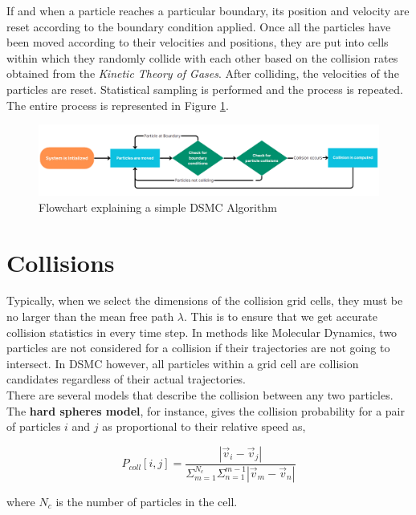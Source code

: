 \no If and when a particle reaches a particular boundary, its position and velocity are reset according to the boundary condition applied. Once all the particles have been moved according to their velocities and positions, they are put into cells within which they randomly collide with each other based on the collision rates obtained from the \textit{Kinetic Theory of Gases}. After colliding, the velocities of the particles are reset. Statistical sampling is performed and the process is repeated. The entire process is represented in Figure \ref{img:algo}.

\begin{figure}[H]
  \includegraphics[scale=0.38]{Pictures/Chapter_3_DSMC/Algorithm.png}
  \centering
  \caption{Flowchart explaining a simple DSMC Algorithm}
  \label{img:algo}
\end{figure}

\section{Collisions}

Typically, when we select the dimensions of the collision grid cells, they must be no larger than the mean free path $\lambda$. This is to ensure that we get accurate collision statistics in every time step. In methods like Molecular Dynamics, two particles are not considered for a collision if their trajectories are not going to intersect. In DSMC however, all particles within a grid cell are collision candidates regardless of their actual trajectories. \\

\no There are several models that describe the collision between any two particles. The \textbf{hard spheres model}, for instance, gives the collision probability for a pair of particles $i$ and $j$ as proportional to their relative speed as,

\begin{equation}
	P_{coll}[i, j] = \frac{|\vec{v}_i - \vec{v}_j|}{\Sigma_{m=1}^{N_c} \Sigma_{n=1}^{m-1} |\vec{v}_m - \vec{v}_n|}
\end{equation}

\no where $N_c$ is the number of particles in the cell. \\

